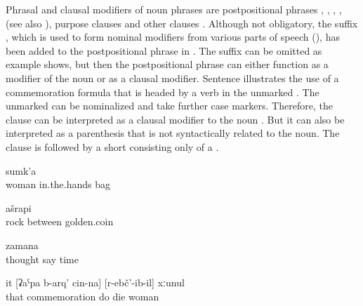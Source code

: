 Phrasal and clausal modifiers of noun phrases are postpositional phrases , , ,  ,  (see also ), purpose clauses  and other clauses . Although not obligatory, the suffix , which is used to form nominal modifiers from various parts of speech (), has been added to the postpositional phrase in . The suffix can be omitted as example  shows, but then the postpositional phrase can either function as a modifier of the noun or as a clausal modifier. Sentence  illustrates the use of a commemoration formula that is headed by a verb in the unmarked . The unmarked  can be nominalized and take further case markers. Therefore, the  clause can be interpreted as a clausal modifier to the noun  . But it can also be interpreted as a parenthesis that is not syntactically related to the noun. The  clause is followed by a short  consisting only of a .
%
\begin{exe}

		\ex	\label{ex:the bag in the hands of the woman@9b}
			sumk'a\\
			woman	in.the.hands	bag\\
		\glt	{}
	
		\ex	\label{ex:the golden coin between the rocks}
			ašrapi\\
			rock	between	golden.coin\\
		\glt	{}
	
		\ex	\label{ex:time to think}
		\gll	[pikri	Ø-ik'ʷ-ij]	zamana\\
			thought	say	time\\
		\glt	{}
	
		\ex	\label{ex:that dead woman, may she rest in peace@9c}
		\gll	it	[ʡaˁpa	b-arq'	cin-na]	[r-ebč'-ib-il]	xːunul\\
			that	commemoration	do		die	woman\\
		\glt	{}

\end{exe}


